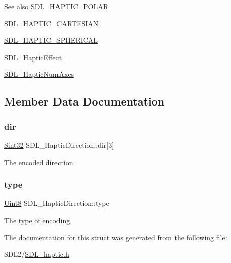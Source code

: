 \begin{DoxySeeAlso}{See also}
\hyperlink{_s_d_l__haptic_8h_acdc35e97e5525472054a67b76e518f3b}{S\+D\+L\+\_\+\+H\+A\+P\+T\+I\+C\+\_\+\+P\+O\+L\+AR} 

\hyperlink{_s_d_l__haptic_8h_af8b2430a363a968de2a5b64c8f663d3b}{S\+D\+L\+\_\+\+H\+A\+P\+T\+I\+C\+\_\+\+C\+A\+R\+T\+E\+S\+I\+AN} 

\hyperlink{_s_d_l__haptic_8h_a1fcf7cb0eaf3c39b16ba266054e25aff}{S\+D\+L\+\_\+\+H\+A\+P\+T\+I\+C\+\_\+\+S\+P\+H\+E\+R\+I\+C\+AL} 

\hyperlink{union_s_d_l___haptic_effect}{S\+D\+L\+\_\+\+Haptic\+Effect} 

\hyperlink{_s_d_l__haptic_8h_ad6705645197f6df4eeeea32392462483}{S\+D\+L\+\_\+\+Haptic\+Num\+Axes} 
\end{DoxySeeAlso}


\subsection{Member Data Documentation}
\mbox{\label{struct_s_d_l___haptic_direction_a6cebd8118a3e61e36bd0c503ae020362}} 
\subsubsection{\texorpdfstring{dir}{dir}}
{\footnotesize\ttfamily \hyperlink{_s_d_l__stdinc_8h_a7a90b941db9d4582e9ad7abb9940ff7e}{Sint32} S\+D\+L\+\_\+\+Haptic\+Direction\+::dir\mbox{[}3\mbox{]}}

The encoded direction. \mbox{\label{struct_s_d_l___haptic_direction_acd6830ad68c4ba2af16057fa418087cc}} 
\subsubsection{\texorpdfstring{type}{type}}
{\footnotesize\ttfamily \hyperlink{_s_d_l__stdinc_8h_a2944638813a090aa23e62f4da842c3e2}{Uint8} S\+D\+L\+\_\+\+Haptic\+Direction\+::type}

The type of encoding. 

The documentation for this struct was generated from the following file\+:\begin{DoxyCompactItemize}
\item 
S\+D\+L2/\hyperlink{_s_d_l__haptic_8h}{S\+D\+L\+\_\+haptic.\+h}\end{DoxyCompactItemize}

